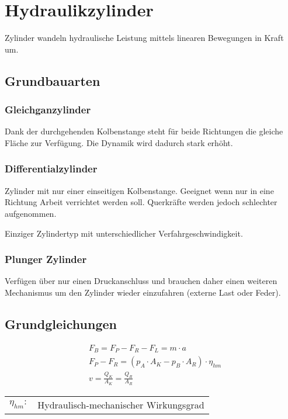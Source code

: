 \section{Hydraulikzylinder}
Zylinder wandeln hydraulische Leistung mittels linearen Bewegungen in Kraft um.  


\subsection{Grundbauarten}
\subsubsection*{Gleichganzylinder}
Dank der durchgehenden Kolbenstange steht für beide Richtungen die gleiche Fläche zur Verfügung. Die Dynamik wird dadurch stark erhöht.


\subsubsection*{Differentialzylinder}
Zylinder mit nur einer einseitigen Kolbenstange. Geeignet wenn nur in eine Richtung Arbeit verrichtet werden soll. Querkräfte werden jedoch schlechter aufgenommen.

Einziger Zylindertyp mit unterschiedlicher Verfahrgeschwindigkeit.


\subsubsection*{Plunger Zylinder}
Verfügen über nur einen Druckanschluss und brauchen daher einen weiteren Mechanismus um den Zylinder wieder einzufahren (externe Last oder Feder). 



\subsection{Grundgleichungen}
\begin{align*}
&F_B = F_P - F_R - F_L = m \cdot a \\
&F_P - F_R = (p_A \cdot A_K - p_B \cdot A_R) \cdot \eta_{hm} \\
&v = \frac{Q_K}{A_K} = \frac{Q_R}{A_R} \tag{stationäre Geschw.}
\end{align*}
\begin{tabular}{ll}
$\eta_{hm}:$ & Hydraulisch-mechanischer Wirkungsgrad
\end{tabular} \\

